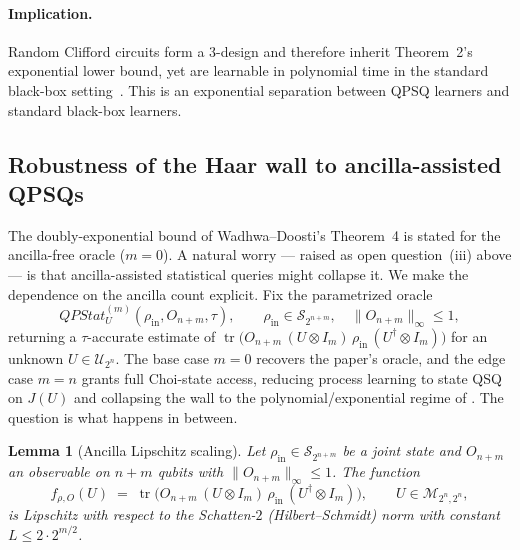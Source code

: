 \documentclass[11pt]{article}
\newtheorem{lemma}{Lemma}
\newcommand{\tr}{\operatorname{tr}}
\begin{document}
\paragraph{Implication.}
Random Clifford circuits form a 3-design and therefore inherit
Theorem~2's exponential lower bound, yet are learnable in polynomial
time in the standard black-box setting~\cite{webb2016cliffordtdesign}.
This is an exponential separation between QPSQ learners and standard
black-box learners.

\subsection{Robustness of the Haar wall to ancilla-assisted QPSQs}
\label{sec:ancilla-wall}

The doubly-exponential bound of Wadhwa--Doosti's Theorem~4 is stated for
the ancilla-free oracle ($m=0$). A natural worry --- raised as open
question~(iii) above --- is that ancilla-assisted statistical queries
might collapse it. We make the dependence on the ancilla count explicit.
Fix the parametrized oracle
\[
  QPStat^{(m)}_U(\rho_{\mathrm{in}}, O_{n+m}, \tau),
  \qquad
  \rho_{\mathrm{in}} \in \mathcal{S}_{2^{n+m}},
  \quad \|O_{n+m}\|_\infty \le 1,
\]
returning a $\tau$-accurate estimate of
$\tr\!\big(O_{n+m}\,(U\otimes I_m)\,\rho_{\mathrm{in}}\,(U^\dagger\otimes I_m)\big)$
for an unknown $U \in \mathcal{U}_{2^n}$. The base case $m=0$ recovers the
paper's oracle, and the edge case $m=n$ grants full Choi-state access,
reducing process learning to state QSQ on $J(U)$ and collapsing the wall
to the polynomial/exponential regime of \cite{angrisani2023learningunitaries}.
The question is what happens in between.

\begin{lemma}[Ancilla Lipschitz scaling]\label{lem:ancilla-lipschitz}
Let $\rho_{\mathrm{in}} \in \mathcal{S}_{2^{n+m}}$ be a joint state and
$O_{n+m}$ an observable on $n+m$ qubits with $\|O_{n+m}\|_\infty \le 1$.
The function
\[
  f_{\rho,O}(U) \;=\;
  \tr\!\big(O_{n+m}\,(U\otimes I_m)\,\rho_{\mathrm{in}}\,(U^\dagger\otimes I_m)\big),
  \qquad U \in \mathcal{M}_{2^n,2^n},
\]
is Lipschitz with respect to the Schatten-$2$ (Hilbert--Schmidt) norm with
constant $L \le 2\cdot 2^{m/2}$.
\end{lemma}
\end{document}
